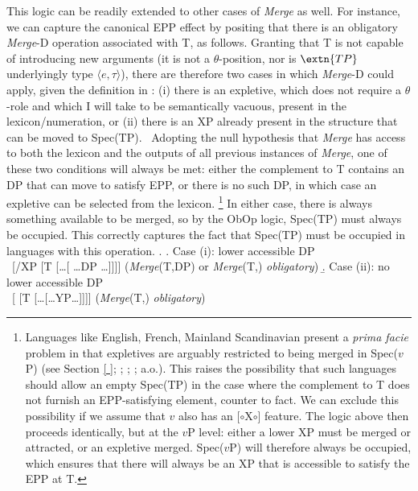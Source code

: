 \documentclass[11pt, letterpaper]{paper_nick}
\newcommand{\fm}[1]{[$\circ$#1$\circ$]}
\begin{document}
This logic can be readily extended to other cases of \emph{Merge} as well. For instance, we can capture the canonical EPP effect by positing that there is an obligatory \emph{Merge}-{D} operation associated with T, as follows. Granting that T is not capable of introducing new arguments (it is not a $\theta$-position, nor is $\extn{TP}$ underlyingly type $\langle e,\tau\rangle$), there are therefore two cases in which \emph{Merge}-D could apply, given the definition in \Last: (i) there is an expletive, which does not require a $\theta$-role and which I will take to be semantically vacuous, present in the lexicon/numeration, or (ii) there is an XP already present in the structure that can be moved to Spec(TP).%
\ Adopting the null hypothesis that \emph{Merge} has access to both the lexicon and the outputs of all previous instances of \emph{Merge}, one of these two conditions will always be met: either the complement to T contains an DP that can move to satisfy EPP, or there is no such DP, in which case an expletive can be selected from the lexicon. 
\footnote{\label{expl1} Languages like English, French, Mainland Scandinavian present a \emph{prima facie} problem in that expletives are arguably restricted to being merged in Spec($v$P) (see Section \ref{ }; \citealt{richards06}; \citealt{deal09}; \citealt{wu}; a.o.). This raises the possibility that such languages should allow an empty Spec(TP) in the case where the complement to T does not furnish an EPP-satisfying element, counter to fact. We can exclude this possibility if we assume that $v$ also has an \fm{X} feature. The logic above then proceeds identically, but at the $v$P level: either a lower XP must be merged or attracted, or an expletive merged. Spec($v$P) will therefore always be occupied, which ensures that there will always be an XP that is accessible to satisfy the EPP at T.} In either case, there is always something available to be merged, so by the ObOp logic, Spec(TP) must always be occupied. This correctly captures the fact that Spec(TP) must be occupied in languages with this operation.  
\ex. \a. Case (i): lower accessible DP\\
\ [/XP [T [\ldots[ \ldots DP \ldots]]]] \hfill (\emph{Merge}(T,DP) or \emph{Merge}(T,) \emph{obligatory})
\b. Case (ii): no lower accessible DP\\
\ [ [T [\ldots[\ldots YP\ldots]]]] \hfill (\emph{Merge}(T,) \emph{obligatory})
\end{document}

